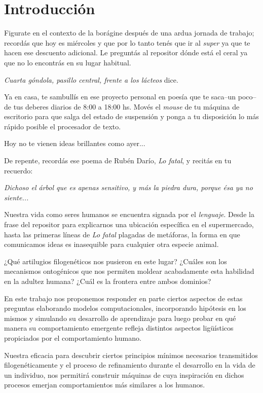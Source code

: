 \chapter{Introducción}

Figurate en el contexto de la borágine después de una ardua jornada de trabajo; recordás que hoy es miércoles y que por lo tanto tenés que ir al \emph{super} ya que te hacen ese descuento adicional. Le preguntás al repositor dónde está el ceral ya que no lo encontrás en su lugar habitual.

\emph{Cuarta góndola, pasillo central, frente a los lácteos} dice.

Ya en casa, te sambullís en ese proyecto personal en poesía que te saca--un poco--de tus deberes diarios de 8:00 a 18:00 hs.
Movés el \emph{mouse} de tu máquina de escritorio para que salga del estado de suspensión y ponga a tu disposición lo más rápido posible el procesador de texto.

Hoy no te vienen ideas brillantes como ayer...

De repente, recordás ese poema de Rubén Darío, \emph{Lo fatal}, y recitás en tu recuerdo:

\emph{Dichoso el árbol que es apenas sensitivo, y más la piedra dura, porque ésa ya no siente...}


Nuestra vida como seres humanos se encuentra signada por el \emph{lenguaje}.
Desde la frase del repositor para explicarnos una ubicación específica en el supermercado, hasta las primeras líneas de \emph{Lo fatal} plagadas de metáforas,
la forma en que comunicamos ideas es inasequible para cualquier otra especie animal.

¿Qué artilugios filogenéticos nos pusieron en este lugar?
¿Cuáles son los mecanismos ontogénicos que nos permiten moldear acabadamente esta habilidad en la adultez humana?
¿Cuál es la frontera entre ambos dominios?

En este trabajo nos proponemos responder en parte ciertos aspectos de estas preguntas elaborando modelos computacionales, incorporando hipótesis en los mismos y simulando su desarrollo de aprendizaje para luego probar en qué manera su comportamiento emergente refleja distintos aspectos ligüísticos propiciados por el comportamiento humano.

Nuestra eficacia para descubrir ciertos principios mínimos necesarios transmitidos filogenéticamente y el proceso de refinamiento durante el desarrollo en la vida de un individuo, nos permitirá construir máquinas de cuya inspiración en dichos procesos emerjan comportamientos más similares a los humanos.

